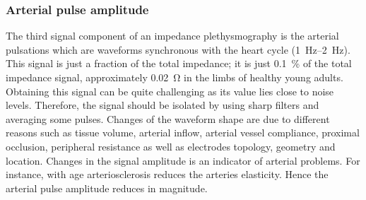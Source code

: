 \subsubsection{Arterial pulse amplitude}
The third signal component of an impedance plethysmography is the arterial pulsations which are waveforms synchronous with the heart cycle (\SIrange{1}{2}{\hertz}). This signal is just a fraction of the total impedance; it is just \SI{0.1}{\percent} of the total impedance signal, approximately \SI{0.02}{\ohm} in the limbs of healthy young adults. Obtaining this signal can be quite challenging as its value lies close to noise levels. Therefore, the signal should be isolated by using sharp filters and averaging some pulses. Changes of the waveform shape are due to different reasons such as tissue volume, arterial inflow, arterial vessel compliance, proximal occlusion, peripheral resistance as well as electrodes topology, geometry and location.  Changes in the signal amplitude is an indicator of arterial problems. For instance, with age arteriosclerosis reduces the arteries elasticity. Hence the arterial pulse amplitude reduces in magnitude.



